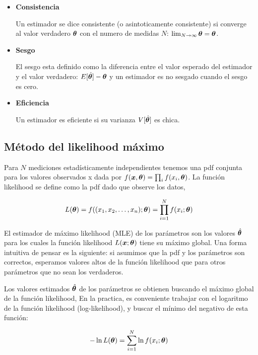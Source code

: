 \begin{itemize}\itemsep0.2cm\parskip0.2cm
\item[] {\bf Consistencia}

  Un estimador se dice consistente (o asintoticamente consistente) si converge
  al valor verdadero $\bm{\theta}$ con el numero de medidas $N$: $\lim_{N \rightarrow \infty} \bm{\theta} = \bm{\theta}$.

\item[] {\bf Sesgo}

  El sesgo esta definido como la diferencia entre el valor esperado del estimador y el valor
  verdadero: $E[\hat{\bm{\theta}}] - \bm{\theta}$ y un estimador es no sesgado cuando el sesgo es cero.

\item[] {\bf Eficiencia}

  Un estimador es eficiente si su varianza $V[\hat{\bm{\theta}}]$ es chica.

\end{itemize}

\subsection{Método del likelihood máximo}

Para $N$ mediciones estadísticamente independientes tenemos una pdf conjunta para los
valores observados x dada por $f(\bm{x}, \bm{\theta}) = \prod_i f(x_i, \bm{\theta})$. La función
likelihood se define como la pdf dado que observe los datos,

\begin{equation}
  L(\bm{\theta}) = f((x_1, x_2, \ldots, x_n); \bm{\theta}) = \prod_{i=1}^{N} f(x_i; \bm{\theta})
\end{equation}

El estimador de máximo likelihood (MLE) de los parámetros {\btheta} son los valores
$\hat{\bm{\theta}}$ para los cuales la función likelihood $L(\bm{x};\bm{\theta})$ tiene su
máximo global. Una forma intuitiva de pensar es la siguiente: si asumimos que la pdf y
los parámetros son correctos, esperamos valores altos de la función likelihood que para
otros parámetros que no sean los verdaderos.

Los valores estimados $\hat{\bm{\theta}}$ de los parámetros se obtienen buscando el máximo
global de la función likelihood, En la practica, es conveniente trabajar con el logaritmo
de la función likelihood (log-likelihood), y buscar el mínimo del negativo de esta función:

\begin{equation}
  - \ln L(\bm{\theta}) = \sum_{i=1}^{N} \ln f(x_i; \bm{\theta})
\end{equation}

